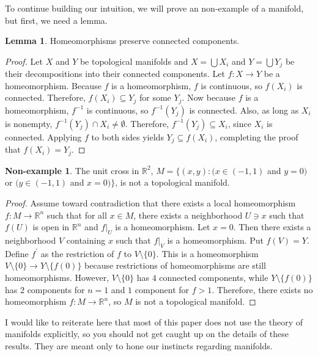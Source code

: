\documentclass[12pt]{article}
\newcommand{\R}{\mathbb{R}}
\theoremstyle{definition}
\theoremstyle{definition}
\theoremstyle{definition}
\newtheorem{lem}[them]{Lemma}
\theoremstyle{definition}
\theoremstyle{definition}
\theoremstyle{definition}
\theoremstyle{definition}
\newtheorem{nex}[them]{Non-example}
\theoremstyle{definition}
\begin{document}
\par{To continue building our intuition, we will prove an non-example of a manifold, but first, we need a lemma.}

\begin{lem} 
Homeomorphisms preserve connected components.
\end{lem}
\begin{proof}
\par{Let $X$ and $Y$ be topological manifolds
and $X = \bigcup X_i$ and $Y = \bigcup Y_j$ be their
decompositions into their connected
components. Let $f: X \to Y$ be a
homeomorphism. Because $f$ is a homeomorphism,
$f$ is continuous, so $f(X_i)$ is connected.
Therefore, $f(X_i) \subseteq Y_j$ for some
$Y_j$. Now because $f$ is a homeomorphism,
$f^{-1}$ is continuous, so $f^{-1}(Y_j)$ is
connected. Also, as long as $X_i$ is nonempty,
$f^{-1}(Y_j) \cap X_i \neq \emptyset$.
Therefore, $f^{-1}(Y_j) \subseteq X_i$}, since
$X_i$ is connected. Applying $f$ to both sides
yields $Y_j \subseteq f(X_i)$, completing the
proof that $f(X_i) = Y_j$.
\end{proof}

\begin{nex} 
The unit cross in $\R^2$, $M = \{(x,y): \big(x \in
(-1,1)$ and $y = 0\big)$ or $\big(y \in (-1,1)$
and $x = 0\big)\}$, is not a topological manifold.
\end{nex}
\begin{proof}
Assume toward contradiction that there exists a
local homeomorphism $f: M \to \R^n$ such that for
all $x \in M$, there exists a neighborhood $U \ni
x$ such that $f(U)$ is open in $\R^n$ and
$f\big|_U$ is a homeomorphism. Let $x = 0$. Then
there exists a neighborhood $V$ containing $x$
such that $f\big|_V$ is a homeomorphism. Put $f(V)
= Y$. Define $f^\prime$ as the restriction of $f$
to $V \setminus \{0\}$. This is a homeomorphism $V
\setminus \{0\} \to Y \setminus \{f(0)\}$ because
restrictions of homeomorphisms are still
homeomorphisms. However, $V \setminus \{0\}$ has
$4$ connected components, while $Y \setminus
\{f(0)\}$ has $2$ components for $n = 1$ and $1$
component for $f > 1$. Therefore, there exists no
homeomorphism $f: M \to \R^n$, so $M$ is not a
topological manifold.
\end{proof}

\par{I would like to reiterate here that most of this paper does not use the theory of manifolds explicitly, so you should not get caught up on the details of these results. They are meant only to hone our instincts regarding manifolds.}
\end{document}
